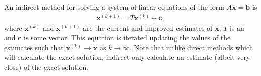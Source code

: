 \documentclass[letterpaper,10pt,english]{jupyterBook}
\begin{document}
\sphinxAtStartPar
An indirect method for solving a system of linear equations of the form \(A \mathbf{x}= \mathbf{b}\) is
\begin{equation}\label{equation:7_Indirect_methods/7.0_Indirect_methods:iteration-matrix-equation}
\begin{split}\mathbf{x}^{(k+1)} =T\mathbf{x}^{(k)} + \mathbf{c},\end{split}
\end{equation}
\sphinxAtStartPar
where \(\mathbf{x}^{(k)}\) and \(\mathbf{x}^{(k+1)}\) are the current and improved estimates of \(\mathbf{x}\), \(T\) is an  and \(\mathbf{c}\) is some vector. This equation is iterated updating the values of the estimates such that \(\mathbf{x}^{(k)} \to \mathbf{x}\) as \(k\to \infty\). Note that unlike direct methods which will calculate the exact solution, indirect only calculate an estimate (albeit very close) of the exact solution.

\sphinxstepscope
\end{document}
